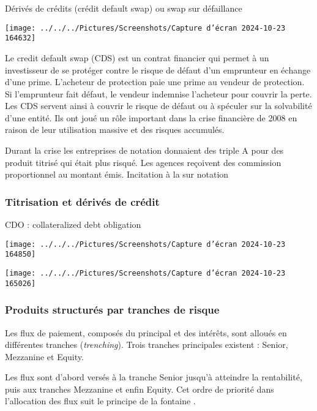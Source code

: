 \documentclass[a4paper, 12pt]{report}
\begin{document}
Dérivés de crédits (crédit default swap) ou swap sur défaillance

\begin{center}
\texttt{[image: ../../../Pictures/Screenshots/Capture d'écran 2024-10-23 164632]}
\end{center}

Le credit default swap (CDS) est un contrat financier qui permet à un investisseur de se protéger contre le risque de défaut d'un emprunteur en échange d'une prime. L’acheteur de protection paie une prime au vendeur de protection. Si l'emprunteur fait défaut, le vendeur indemnise l’acheteur pour couvrir la perte. Les CDS servent ainsi à couvrir le risque de défaut ou à spéculer sur la solvabilité d'une entité. Ils ont joué un rôle important dans la crise financière de 2008 en raison de leur utilisation massive et des risques accumulés.

Durant la crise les entreprises de notation donnaient des triple A pour des produit titrisé qui était plus risqué. Les agences reçoivent des commission proportionnel au montant émis. Incitation à la sur notation



\subsubsection{Titrisation et dérivés de crédit}

CDO : collateralized debt obligation

\begin{center}
	\texttt{[image: ../../../Pictures/Screenshots/Capture d'écran 2024-10-23 164850]}
\end{center}

\begin{center}
	\texttt{[image: ../../../Pictures/Screenshots/Capture d'écran 2024-10-23 165026]}
\end{center}

\subsubsection{Produits structurés par tranches de risque}

Les flux de paiement, composés du principal et des intérêts, sont alloués en différentes tranches (\textit{trenching}). Trois tranches principales existent : Senior, Mezzanine et Equity.

Les flux sont d’abord versés à la tranche Senior jusqu’à atteindre la rentabilité, puis aux tranches Mezzanine et enfin Equity. Cet ordre de priorité dans l’allocation des flux suit le principe de la \og fontaine \fg.
\end{document}
